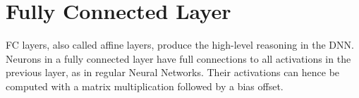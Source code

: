 \chapter{Fully Connected Layer}
FC layers, also called affine layers, produce the high-level reasoning in the DNN. Neurons in a fully connected layer have full connections to all activations in the previous layer, as in regular Neural Networks. Their activations can hence be computed with a matrix multiplication followed by a bias offset.